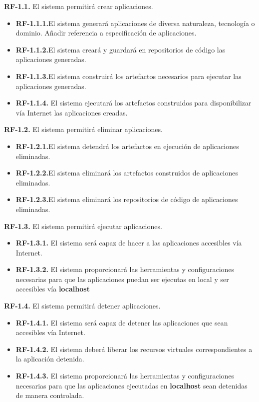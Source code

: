 \documentclass[a4paper,11pt]{book}
\begin{document}
\textbf{RF-1.1.} El sistema permitirá crear aplicaciones.
\begin{itemize}
 \item 	\textbf{RF-1.1.1.}El sistema generará aplicaciones de diversa naturaleza, tecnología o dominio. Añadir referencia a especificación de aplicaciones.
 \item 	\textbf{RF-1.1.2.}El sistema creará y  guardará en repositorios de código las aplicaciones generadas.
  \item \textbf{RF-1.1.3.}El sistema construirá los artefactos necesarios para ejecutar las aplicaciones generadas.
   \item  \textbf{RF-1.1.4.} El sistema ejecutará los artefactos construidos para disponibilizar vía Internet las aplicaciones creadas. \\
\end{itemize}


\textbf{RF-1.2.} El sistema permitirá eliminar aplicaciones.
\begin{itemize}
 \item 	\textbf{RF-1.2.1.}El sistema detendrá los artefactos en ejecución de aplicaciones eliminadas.
  \item 	\textbf{RF-1.2.2.}El sistema eliminará los artefactos construidos de aplicaciones eliminadas.
   \item  \textbf{RF-1.2.3.}El sistema eliminará los repositorios de código de aplicaciones eliminadas.	\\
\end{itemize}


\textbf{RF-1.3.} El sistema permitirá ejecutar aplicaciones.
\begin{itemize}
 \item \textbf{RF-1.3.1.} El sistema será capaz de hacer a las aplicaciones accesibles vía Internet.
 \item  \textbf{RF-1.3.2.} El sistema proporcionará las herramientas  y configuraciones necesarias para que las aplicaciones puedan ser ejecutas en local y ser accesibles vía \textbf{localhost}  \\
\end{itemize}


\textbf{RF-1.4.} El sistema permitirá detener aplicaciones.

\begin{itemize}
 \item  \textbf{RF-1.4.1.} El sistema será capaz de detener las aplicaciones que sean accesibles vía Internet.
  \item  \textbf{RF-1.4.2.} El sistema deberá liberar los recursos virtuales correspondientes a la aplicación detenida.
  \item  \textbf{RF-1.4.3.} El sistema proporcionará las herramientas  y configuraciones necesarias para que las aplicaciones ejecutadas en \textbf{localhost}  sean detenidas de manera controlada. \\
\end{itemize}
\end{document}
